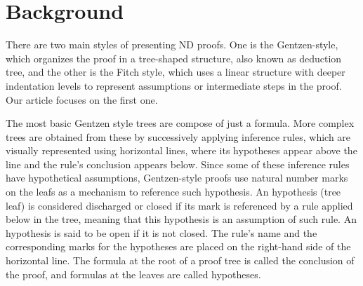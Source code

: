 \section{Background}
There are two main styles of presenting ND proofs. One is the Gentzen-style, which organizes the proof in a tree-shaped structure, also known as deduction tree, and the other is the Fitch style, which uses a linear structure with deeper indentation levels to represent assumptions or intermediate steps in the proof. Our article focuses on the first one. 

The most basic Gentzen style trees are compose of just a formula. More complex trees are obtained from these by successively applying inference rules, which are visually represented using horizontal lines, where its hypotheses appear above the line and the rule’s conclusion appears below. Since some of these inference rules have hypothetical assumptions, Gentzen-style proofs use natural number marks on the leafs as a mechanism to reference such hypothesis. An hypothesis (tree leaf) is considered discharged or closed if its mark is referenced by a rule applied below in the tree, meaning that this hypothesis is an assumption of such rule. An hypothesis is said to be open if it is not closed. The rule’s name and the corresponding marks for the hypotheses are placed on the right-hand side of the horizontal line.
The formula at the root of a proof tree is called the conclusion of the proof, and formulas at the leaves are called hypotheses.   

